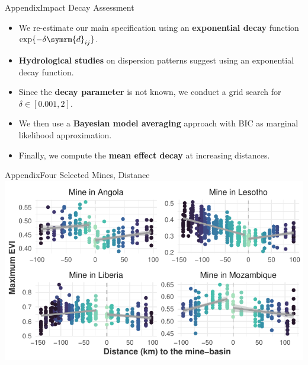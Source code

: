 \documentclass[aspectratio=169,11pt,dvipsnames, handout]{beamer}
\begin{document}
\begin{frame}{\textcolor{defaultclr!30}{Appendix}\hspace{0.75em}Impact Decay Assessment}
\label{frame:appdecay}
\begin{itemize}
    \item We re-estimate our main specification using an \textbf{exponential decay} function \(\exp\{-\delta \symrm{d}_{ij}\}\).
    \item \textbf{Hydrological studies} on dispersion patterns suggest using an exponential decay function.
    \item Since the \textbf{decay parameter} is not known, we conduct a grid search for \(\delta \in [0.001, 2]\).
    \item We then use a \textbf{Bayesian model averaging} approach with BIC as marginal likelihood approximation.
    \item Finally, we compute the \textbf{mean effect decay} at increasing distances.
\end{itemize}

  \centering\hyperlink{frame:decay}{} 
\end{frame}


\begin{frame}{\textcolor{defaultclr!30}{Appendix}\hspace{0.75em}Four Selected Mines, Distance}
\label{frame:appintu}
  \centering
  \includegraphics[width=.8\linewidth]{img/mine-basin_dist-discont.pdf}

  \hyperlink{frame:intu}{} 
\end{frame}

\end{document}
